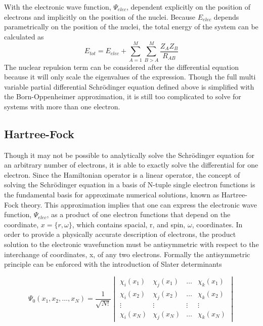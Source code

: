   With the electronic wave function, $\Psi_{elec}$, dependent explicitly on the position of electrons and implicitly on the position of the nuclei.  Because $E_{elec}$ depends parametrically on the position of the nuclei, the total energy of the system can be calculated as 
    \begin{equation}
      E_{tot} = E_{elec} + \sum_{A=1}^{M} \sum_{B>A}^{M} \frac{Z_A Z_B}{R_{AB}}
    \end{equation}
  The nuclear repulsion term can be considered after the differential equation because it will only scale the eigenvalues of the expression.  Though the full multi variable partial differential Schr{\"o}dinger equation defined above is simplified with the Born-Oppenheimer approximation, it is still too complicated to solve for systems with more than one electron.\cite{Szabo 1970}


  \subsection{Hartree-Fock}
    Though it may not be possible to analytically solve the Schr{\"o}dinger equation for an arbitrary number of electrons, it is able to exactly solve the differential for one electron.  Since the Hamiltonian operator is a linear operator, the concept of solving the Schr{\"o}dinger equation in a basis of N-tuple single electron functions is the fundamental basis for approximate numerical solutions, known as Hartree-Fock theory. \cite{Hartree 1928, Fock 1930, Szabo 1996, Sherril 2000} This approximation implies that one can express the electronic wave function, $\Psi_{elec}$, as a product of one electron functions that depend on the coordinate, $x = \{r, \omega\}$, which contains spacial, r, and spin, $\omega$, coordinates. In order to provide a physically accurate description of electrons, the product solution to the electronic wavefunction must be antisymmetric with respect to the interchange of coordinates, x, of any two electrons.  Formally the antisymmetric principle can be enforced with the introduction of Slater determinants\cite{Slater 1929, Slater 1930} 

    \begin{equation}
    \Psi_{0}(x_1, x_2, ..., x_N) = \frac{1}{\sqrt{N!}}
    \begin{vmatrix}
     \chi_i(x_1) &\chi_j(x_1) &\ldots   &\chi_k(x_1)   \\
     \chi_i(x_2) &\chi_j(x_2)  &\ldots & \chi_k(x_2)   \\
     \vdots&\vdots   &\vdots &\vdots   \\
     \chi_i(x_N) &\chi_j(x_N) & \ldots & \chi_k(x_N)
    \end{vmatrix}
    \end{equation}

